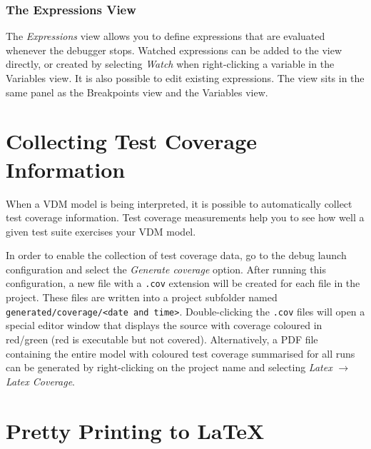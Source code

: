\documentclass{overturerepchap}
\begin{document}
\subsection{The Expressions View}

The \emph{Expressions} view allows you to define expressions that are evaluated
whenever the debugger stops.
Watched expressions can be added to the view directly, or created by selecting \emph{Watch}
when right-clicking a variable in the Variables view. It is also possible to edit existing
expressions. The view sits in the same panel as the Breakpoints view and
the Variables view.

\chapter{Collecting Test Coverage Information}\label{sec:testcoverage}

When a VDM model is being interpreted, it is possible to automatically collect
test coverage information. Test coverage measurements help you to see how well a
given test suite exercises your VDM model.

In order to enable the collection of test coverage data, go to the debug launch
configuration and select the \emph{Generate coverage} option. After
running this configuration, a new file with a \texttt{.cov} extension will be created for
each file in the project. These files are written into a project subfolder named
\texttt{generated/coverage/<date and time>}. Double-clicking the \texttt{.cov} files
will open a special editor window that displays the source with coverage
coloured in red/green (red is executable but not covered). Alternatively, a PDF file
containing the entire model with coloured test coverage summarised for all runs
can be generated
by right-clicking on the project name and selecting \emph{Latex} $\rightarrow$
\emph{Latex Coverage}.

\chapter{Pretty Printing to \LaTeX}\label{sec:prettyprint}

\end{document}
